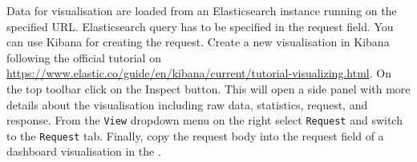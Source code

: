 Data for visualisation are loaded from an Elasticsearch instance running on the specified URL\@.
Elasticsearch query has to be specified in the request field.
You can use Kibana for creating the request.
Create a new visualisation in Kibana following the official tutorial on \url{https://www.elastic.co/guide/en/kibana/current/tutorial-visualizing.html}.
On the top toolbar click on the Inspect button.
This will open a side panel with more details about the visualisation including raw data, statistics, request, and response.
From the \texttt{View} dropdown menu on the right select \texttt{Request} and switch to the \texttt{Request} tab.
Finally, copy the request body into the request field of a dashboard visualisation in the \builder.
